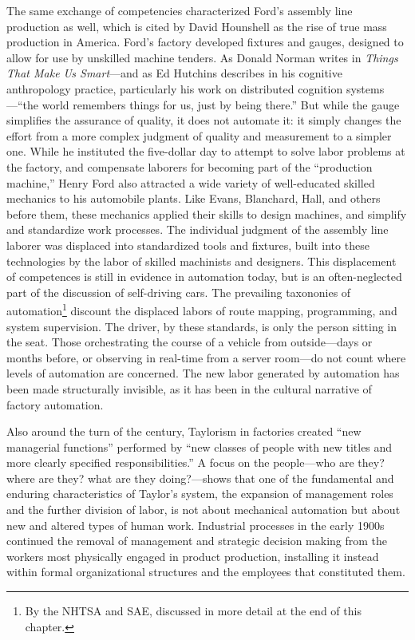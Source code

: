 The same exchange of competencies characterized Ford's assembly line
production as well, which is cited by David Hounshell as the rise of
true mass production in America.\cite[p. 217]{hounshell} Ford's factory developed fixtures
and gauges, designed to allow for use by unskilled machine tenders. As Donald
Norman writes in \emph{Things That Make Us Smart}---and as Ed
Hutchins describes in his cognitive anthropology practice,
particularly his work
on distributed cognition
systems\cite{hutchinsCockpit}---``the world remembers things for us, just by being
there.''\cite[p. 147]{normanThings} But while the gauge simplifies the
assurance  of quality, it does not
automate it:  it simply changes the effort from a more complex judgment
of quality and measurement to a simpler one. While he instituted the
five-dollar day to attempt to solve labor problems at the factory, and
compensate laborers for becoming part of the ``production machine,''
Henry Ford also attracted a wide variety of well-educated skilled mechanics
to his automobile plants.\cite[p. 223]{hounshell} Like Evans, Blanchard, Hall, and others
before them, these mechanics applied their skills to design machines,
and simplify and standardize work processes. The individual judgment
of the assembly line laborer was displaced into standardized tools and
fixtures, built into these technologies by the labor of skilled
machinists and designers. This displacement of competences is still in
evidence in automation today, but is an often-neglected part of the
discussion of self-driving cars. The prevailing taxononies of
automation\footnote{By the NHTSA and SAE, discussed in more detail at
  the end of this chapter.} discount the displaced labors of route
mapping, programming, and system supervision. The driver, by these
standards, is only the person sitting in the seat. Those orchestrating
the course of a vehicle from outside---days or months before, or
observing in real-time from a server room---do not count where levels of
automation are concerned. The new labor generated by automation has
been made structurally invisible, as it has been in the cultural
narrative of factory automation.

Also around the turn of the century, Taylorism in factories created ``new managerial
functions'' performed by ``new classes of people with new titles and
more clearly specified responsibilities.''\cite[p. 120]{aitken} A focus on the
people---who are they? where are they? what are they doing?---shows that
one of the fundamental and enduring characteristics of Taylor's
system, the expansion of management roles and the further division of
labor, is not about mechanical automation but about new and altered
types of human work. Industrial processes in the early 1900s continued
the removal of management and strategic decision making from the
workers most physically engaged in product production, installing it
instead within formal organizational structures and the employees that
constituted them. 

